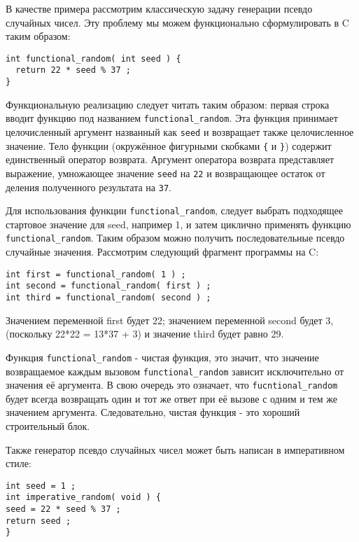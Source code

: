 В качестве примера рассмотрим классическую задачу генерации псевдо случайных чисел. Эту проблему мы можем функционально сформулировать в C таким образом:

\begin{lstlisting}
int functional_random( int seed ) {
  return 22 * seed % 37 ;
}
\end{lstlisting}

Функциональную реализацию следует читать таким образом: первая строка вводит функцию под названием \lstinline|functional_random|. Эта функция принимает целочисленный аргумент названный как \lstinline|seed| и возвращает также целочисленное значение. Тело функции (окружённое фигурными скобками \lstinline|{| и \lstinline|}|) содержит единственный оператор возврата. Аргумент оператора возврата представляет выражение, умножающее значение \lstinline|seed| на \lstinline|22| и возвращающее остаток от деления полученного результата на \lstinline|37|.

Для использования функции \lstinline|functional_random|, следует выбрать подходящее стартовое значение для seed, например 1, и затем циклично применять функцию \lstinline|functional_random|. Таким образом можно получить последовательные псевдо случайные значения. Рассмотрим следующий фрагмент программы на C:

\begin{lstlisting}
int first = functional_random( 1 ) ;
int second = functional_random( first ) ;
int third = functional_random( second ) ;
\end{lstlisting}

Значением переменной first будет 22; значением переменной second будет 3, (поскольку 22*22 = 13*37 + 3) и значение third будет равно 29.

Функция \lstinline|functional_random| - чистая функция, это значит, что значение возвращаемое каждым вызовом \lstinline|functional_random| зависит исключительно от значения её аргумента. В свою очередь это означает, что \lstinline|fucntional_random| будет всегда возвращать один и тот же ответ при её вызове с одним и тем же значением аргумента. Следовательно, чистая функция - это хороший строительный блок.

Также генератор псевдо случайных чисел может быть написан в императивном стиле:

\begin{lstlisting}
int seed = 1 ;
int imperative_random( void ) {
seed = 22 * seed % 37 ;
return seed ;
}
\end{lstlisting}

